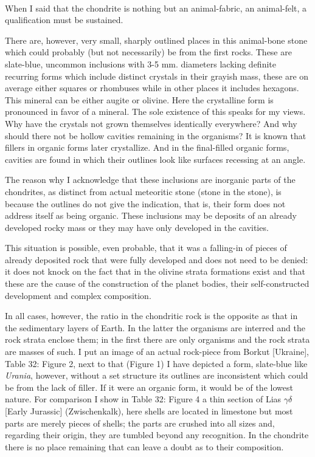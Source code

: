 \documentclass[a4paper, 12pt, oneside]{article}
\begin{document}
\paragraph{}
When I said that the chondrite is nothing but an animal-fabric, an animal-felt, a qualification must be sustained.

There are, however, very small, sharply outlined places in this animal-bone stone which could probably (but not necessarily) be from the first rocks. These are slate-blue, uncommon inclusions with 3-5 mm. diameters lacking definite recurring forms which include distinct crystals in their grayish mass, these are on average either squares or rhombuses while in other places it includes hexagons. This mineral can be either augite or olivine. Here the crystalline form is pronounced in favor of a mineral. The sole existence of this speaks for my views. Why have the crystals not grown themselves identically everywhere? And why should there not be hollow cavities remaining in the organisms? It is known that fillers in organic forms later crystallize. And in the final-filled organic forms, cavities are found in which their outlines look like surfaces recessing at an angle.

The reason why I acknowledge that these inclusions are inorganic parts of the chondrites, as distinct from actual meteoritic stone (stone in the stone), is because the outlines do not give the indication, that is, their form does not address itself as being organic. These inclusions may be deposits of an already developed rocky mass or they may have only developed in the cavities.

This situation is possible, even probable, that it was a falling-in of pieces of already deposited rock that were fully developed and does not need to be denied: it does not knock on the fact that in the olivine strata formations exist and that these are the cause of the construction of the planet bodies, their self-constructed development and complex composition.

In all cases, however, the ratio in the chondritic rock is the opposite as that in the sedimentary layers of Earth. In the latter the organisms are interred and the rock strata enclose them; in the first there are only organisms and the rock strata are masses of such. I put an image of an actual rock-piece from Borkut [Ukraine], Table 32: Figure 2, next to that (Figure 1) I have depicted a form, slate-blue like \emph{Urania}, however, without a set structure its outlines are inconsistent which could be from the lack of filler. If it were an organic form, it would be of the lowest nature. For comparison I show in Table 32: Figure 4 a thin section of Lias $\gamma\delta $ [Early Jurassic] (Zwischenkalk), here shells are located in limestone but most parts are merely pieces of shells; the parts are crushed into all sizes and, regarding their origin, they are tumbled beyond any recognition. In the chondrite there is no place remaining that can leave a doubt as to their composition.
\clearpage
\end{document}
